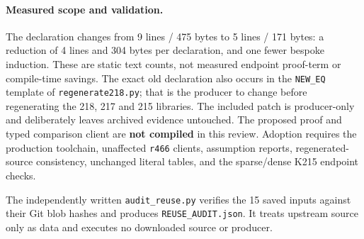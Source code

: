 \paragraph{Measured scope and validation.}
The declaration changes from 9 lines / 475 bytes to 5 lines / 171 bytes:
a reduction of 4 lines and 304 bytes per declaration, and one fewer bespoke
induction. These are static text counts, not measured endpoint proof-term or
compile-time savings. The exact old declaration also occurs in the
\texttt{NEW\_EQ} template of \texttt{regenerate218.py}; that is the producer to
change before regenerating the 218, 217 and 215 libraries. The included patch
is producer-only and deliberately leaves archived evidence untouched.
The proposed proof and typed comparison client are \textbf{not compiled} in this
review. Adoption requires the production toolchain, unaffected \texttt{r466}
clients, assumption reports, regenerated-source consistency, unchanged literal
tables, and the sparse/dense K215 endpoint checks.

The independently written \texttt{audit\_reuse.py} verifies the 15 saved inputs
against their Git blob hashes and produces \texttt{REUSE\_AUDIT.json}. It treats
upstream source only as data and executes no downloaded source or producer.
